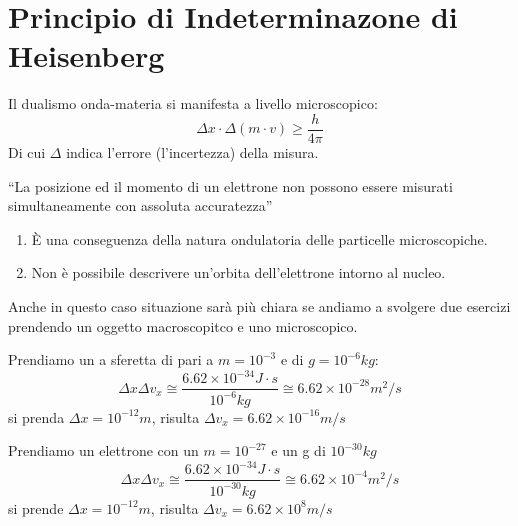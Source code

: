 \section{Principio di Indeterminazone di Heisenberg}
\label{sec:heisenberg}
\begin{defi}
  Il dualismo onda-materia si manifesta a livello microscopico:
  \begin{equation}
    \label{eq:dualismoondamateria}
    \Delta x \cdot \Delta (m\cdot v)\geq \frac{h}{4\pi}
  \end{equation}
  Di cui $\Delta$ indica l'errore (l'incertezza) della misura.
\end{defi}
\begin{prin}
  ``La posizione ed il momento  di un elettrone non possono essere misurati {\color{red}simultaneamente}
  con assoluta accuratezza''
  \begin{enumerate}
  \item È una conseguenza della natura ondulatoria delle particelle microscopiche.
  \item Non è possibile descrivere un'orbita dell'elettrone intorno al nucleo.
  \end{enumerate}
\end{prin}
Anche in questo caso situazione sarà più chiara se andiamo a svolgere due esercizi prendendo un oggetto macroscopitco
e uno microscopico.
\begin{ess}
  Prendiamo un a sferetta di pari a $m=10^{-3}$ e di $g=10^{-6}kg$:
  \begin{equation*}
    \Delta x \Delta v_x \cong \frac{6.62\times 10^{-34}J\cdot s}{10^{-6}kg}\cong 6.62\times 10^{-28}m^2/s
  \end{equation*}
  si prenda $\Delta x = 10^{-12}m$, risulta $\Delta v_x= 6.62\times 10^{-16}m/s$
\end{ess}
\begin{ess}
  Prendiamo un elettrone con un $m=10^{-27}$ e un g di $10^{-30}kg$
  \begin{equation*}
    \Delta x \Delta v_x\cong \frac{6.62\times 10^{-34}J\cdot s}{10^{-30}kg}\cong 6.62\times 10^{-4}m^2/s
  \end{equation*}
  si prende $\Delta x = 10^{-12}m$, risulta $\Delta v_x= 6.62\times 10^8m/s$
\end{ess}

